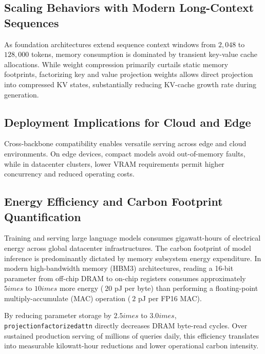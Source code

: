 \subsection{Scaling Behaviors with Modern Long-Context Sequences}
As foundation architectures extend sequence context windows from $2{,}048$ to $128{,}000$ tokens, memory consumption is dominated by transient key-value cache allocations. While weight compression primarily curtails static memory footprints, factorizing key and value projection weights allows direct projection into compressed KV states, substantially reducing KV-cache growth rate during generation.

\subsection{Deployment Implications for Cloud and Edge}
Cross-backbone compatibility enables versatile serving across edge and cloud environments. On edge devices, compact models avoid out-of-memory faults, while in datacenter clusters, lower VRAM requirements permit higher concurrency and reduced operating costs.

\subsection{Energy Efficiency and Carbon Footprint Quantification}
Training and serving large language models consumes gigawatt-hours of electrical energy across global datacenter infrastructures. The carbon footprint of model inference is predominantly dictated by memory subsystem energy expenditure. In modern high-bandwidth memory (HBM3) architectures, reading a 16-bit parameter from off-chip DRAM to on-chip registers consumes approximately $5	imes$ to $10	imes$ more energy ($~20$ pJ per byte) than performing a floating-point multiply-accumulate (MAC) operation ($~2$ pJ per FP16 MAC).

By reducing parameter storage by $2.5	imes$ to $3.0	imes$, \texttt{projectionfactorizedattn} directly decreases DRAM byte-read cycles. Over sustained production serving of millions of queries daily, this efficiency translates into measurable kilowatt-hour reductions and lower operational carbon intensity.
